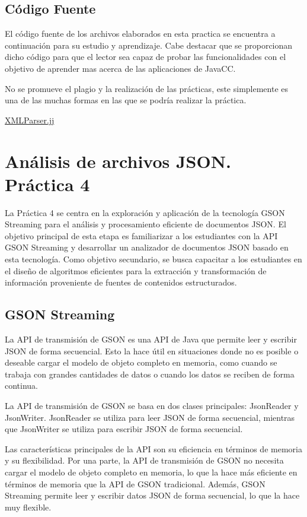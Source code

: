 \subsection{Código Fuente}

\noindent El código fuente de los archivos elaborados en esta practica se encuentra a continuación para su estudio y aprendizaje. Cabe destacar que se proporcionan dicho código para que el lector sea capaz de probar las funcionalidades con el objetivo de aprender mas acerca de las aplicaciones de JavaCC.

No se promueve el plagio y la realización de las prácticas, este simplemente es una de las muchas formas en las que se podría realizar la práctica.

\hyperref[sec:XMLParser]{XMLParser.jj}

\section{Análisis de archivos JSON. Práctica 4}

\noindent La Práctica 4 se centra en la exploración y aplicación de la tecnología GSON Streaming para el análisis y procesamiento eficiente de documentos JSON. El objetivo principal de esta etapa es familiarizar a los estudiantes con la API GSON Streaming y desarrollar un analizador de documentos JSON basado en esta tecnología. Como objetivo secundario, se busca capacitar a los estudiantes en el diseño de algoritmos eficientes para la extracción y transformación de información proveniente de fuentes de contenidos estructurados.

\subsection{GSON Streaming}

\noindent La API de transmisión de GSON es una API de Java que permite leer y escribir JSON de forma secuencial. Esto la hace útil en situaciones donde no es posible o deseable cargar el modelo de objeto completo en memoria, como cuando se trabaja con grandes cantidades de datos o cuando los datos se reciben de forma continua.

La API de transmisión de GSON se basa en dos clases principales: JsonReader y JsonWriter. JsonReader se utiliza para leer JSON de forma secuencial, mientras que JsonWriter se utiliza para escribir JSON de forma secuencial.

Las características principales de la API son su eficiencia en términos de memoria y  su flexibilidad. Por una parte, la API de transmisión de GSON no necesita cargar el modelo de objeto completo en memoria, lo que la hace más eficiente en términos de memoria que la API de GSON tradicional. Además, GSON Streaming permite leer y escribir datos JSON de forma secuencial, lo que la hace muy flexible.

